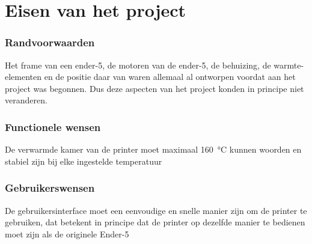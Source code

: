 \chapter{Eisen van het project}
\label{Eisen_van_het_project}

\subsection{Randvoorwaarden}

Het frame van een ender-5, de motoren van de ender-5, de behuizing, de
warmte-elementen en de positie daar van waren allemaal al ontworpen voordat aan
het project was begonnen. Dus deze aspecten van het project konden in principe niet
veranderen.

\subsection{Functionele wensen}

De verwarmde kamer van de printer moet maximaal \SI{160}{\celsius} kunnen
woorden en stabiel zijn bij elke ingestelde temperatuur

\subsection{Gebruikerswensen}

De gebruikersinterface moet een eenvoudige en snelle manier zijn om de printer
te gebruiken, dat betekent in principe dat de printer op dezelfde manier te
bedienen moet zijn als de originele Ender-5

